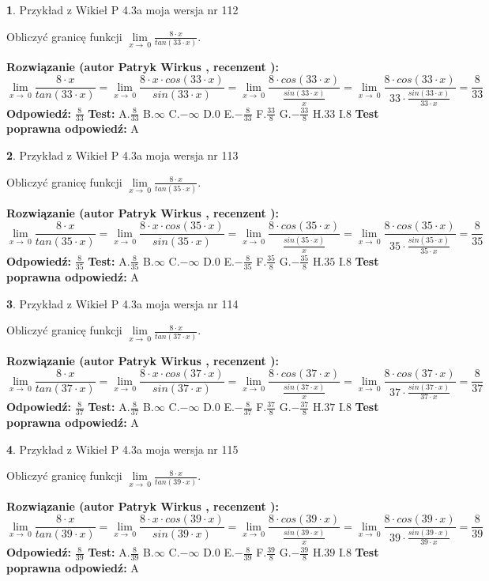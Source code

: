 \documentclass[12pt, a4paper]{article}
\theoremstyle{definition} %
\newtheorem{zad}{}
\newcommand{\zadStart}[1]{\begin{zad}#1\newline}
\newcommand{\zadStop}{\end{zad}}
\newcommand{\rozwStart}[2]{\noindent \textbf{Rozwiązanie (autor #1 , recenzent #2): }\newline}
\newcommand{\rozwStop}{\newline}
\newcommand{\odpStart}{\noindent \textbf{Odpowiedź:}\newline}
\newcommand{\odpStop}{\newline}
\newcommand{\testStart}{\noindent \textbf{Test:}\newline}
\newcommand{\testStop}{\newline}
\newcommand{\kluczStart}{\noindent \textbf{Test poprawna odpowiedź:}\newline}
\newcommand{\kluczStop}{\newline}
\begin{document}
\zadStart{Przykład z Wikieł P 4.3a moja wersja nr 112}


Obliczyć granicę funkcji $\lim\limits_{x\to\ 0}\frac{8 \cdot x}{tan(33 \cdot x)}$.
\zadStop
\rozwStart{Patryk Wirkus}{}
$$\lim\limits_{x\to\ 0}\frac{8 \cdot x}{tan(33 \cdot x)}=\lim\limits_{x\to\ 0}\frac{8 \cdot x \cdot cos(33 \cdot x)}{sin(33 \cdot x)}=\lim\limits_{x\to\ 0}\frac{8 \cdot cos(33 \cdot x)}{\frac{sin(33 \cdot x)}{x}}=\lim\limits_{x\to\ 0}\frac{8 \cdot cos(33 \cdot x)}{33 \cdot \frac{sin(33 \cdot x)}{33 \cdot x}} = \frac{8}{33}$$
\rozwStop
\odpStart
$\frac{8}{33}$
\odpStop
\testStart
A.$\frac{8}{33}$
B.$\infty$
C.$-\infty$
D.$0$
E.$-\frac{8}{33}$
F.$\frac{33}{8}$
G.$-\frac{33}{8}$
H.$33$
I.$8$
\testStop
\kluczStart
A
\kluczStop



\zadStart{Przykład z Wikieł P 4.3a moja wersja nr 113}


Obliczyć granicę funkcji $\lim\limits_{x\to\ 0}\frac{8 \cdot x}{tan(35 \cdot x)}$.
\zadStop
\rozwStart{Patryk Wirkus}{}
$$\lim\limits_{x\to\ 0}\frac{8 \cdot x}{tan(35 \cdot x)}=\lim\limits_{x\to\ 0}\frac{8 \cdot x \cdot cos(35 \cdot x)}{sin(35 \cdot x)}=\lim\limits_{x\to\ 0}\frac{8 \cdot cos(35 \cdot x)}{\frac{sin(35 \cdot x)}{x}}=\lim\limits_{x\to\ 0}\frac{8 \cdot cos(35 \cdot x)}{35 \cdot \frac{sin(35 \cdot x)}{35 \cdot x}} = \frac{8}{35}$$
\rozwStop
\odpStart
$\frac{8}{35}$
\odpStop
\testStart
A.$\frac{8}{35}$
B.$\infty$
C.$-\infty$
D.$0$
E.$-\frac{8}{35}$
F.$\frac{35}{8}$
G.$-\frac{35}{8}$
H.$35$
I.$8$
\testStop
\kluczStart
A
\kluczStop



\zadStart{Przykład z Wikieł P 4.3a moja wersja nr 114}


Obliczyć granicę funkcji $\lim\limits_{x\to\ 0}\frac{8 \cdot x}{tan(37 \cdot x)}$.
\zadStop
\rozwStart{Patryk Wirkus}{}
$$\lim\limits_{x\to\ 0}\frac{8 \cdot x}{tan(37 \cdot x)}=\lim\limits_{x\to\ 0}\frac{8 \cdot x \cdot cos(37 \cdot x)}{sin(37 \cdot x)}=\lim\limits_{x\to\ 0}\frac{8 \cdot cos(37 \cdot x)}{\frac{sin(37 \cdot x)}{x}}=\lim\limits_{x\to\ 0}\frac{8 \cdot cos(37 \cdot x)}{37 \cdot \frac{sin(37 \cdot x)}{37 \cdot x}} = \frac{8}{37}$$
\rozwStop
\odpStart
$\frac{8}{37}$
\odpStop
\testStart
A.$\frac{8}{37}$
B.$\infty$
C.$-\infty$
D.$0$
E.$-\frac{8}{37}$
F.$\frac{37}{8}$
G.$-\frac{37}{8}$
H.$37$
I.$8$
\testStop
\kluczStart
A
\kluczStop



\zadStart{Przykład z Wikieł P 4.3a moja wersja nr 115}


Obliczyć granicę funkcji $\lim\limits_{x\to\ 0}\frac{8 \cdot x}{tan(39 \cdot x)}$.
\zadStop
\rozwStart{Patryk Wirkus}{}
$$\lim\limits_{x\to\ 0}\frac{8 \cdot x}{tan(39 \cdot x)}=\lim\limits_{x\to\ 0}\frac{8 \cdot x \cdot cos(39 \cdot x)}{sin(39 \cdot x)}=\lim\limits_{x\to\ 0}\frac{8 \cdot cos(39 \cdot x)}{\frac{sin(39 \cdot x)}{x}}=\lim\limits_{x\to\ 0}\frac{8 \cdot cos(39 \cdot x)}{39 \cdot \frac{sin(39 \cdot x)}{39 \cdot x}} = \frac{8}{39}$$
\rozwStop
\odpStart
$\frac{8}{39}$
\odpStop
\testStart
A.$\frac{8}{39}$
B.$\infty$
C.$-\infty$
D.$0$
E.$-\frac{8}{39}$
F.$\frac{39}{8}$
G.$-\frac{39}{8}$
H.$39$
I.$8$
\testStop
\kluczStart
A
\kluczStop
\end{document}
